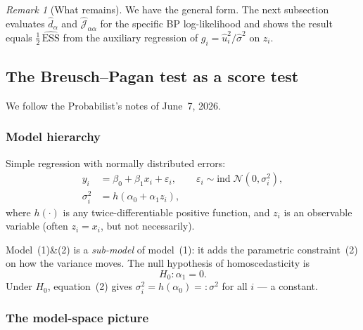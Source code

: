 \documentclass[a4paper,oneside,12pt]{extarticle}
\theoremstyle{plain}
\theoremstyle{definition}
\theoremstyle{remark}
\newtheorem{remark}[proposition]{Remark}
\begin{document}
\begin{remark}[What remains]
We have the general form.  The next subsection evaluates
$\hat{d}_\alpha$ and $\hat{\mathcal{J}}_{\alpha\alpha}$ for the
specific BP log-likelihood and shows the result equals
$\frac{1}{2}\,\widehat{\mathrm{ESS}}$ from the auxiliary
regression of $g_i = \hat{u}_i^2/\hat\sigma^2$ on $z_i$.
\end{remark}


\FloatBarrier
\subsection{The Breusch--Pagan test as a score test}
\label{subsec:bp-score}

We follow the Probabilist's notes of June~7, 2026.

\subsubsection*{Model hierarchy}

Simple regression with normally distributed errors:
\begin{align}
  y_i &= \beta_0 + \beta_1 x_i + \varepsilon_i, \qquad
  \varepsilon_i \sim \mathrm{ind}\; \mathcal{N}(0, \sigma_i^2),
  \tag{1} \\[4pt]
  \sigma_i^2 &= h(\alpha_0 + \alpha_1 z_i),
  \tag{2}
\end{align}
where $h(\cdot)$ is any twice-differentiable positive function, and
$z_i$ is an observable variable (often $z_i = x_i$, but not
necessarily).

Model~(1)\&(2) is a \emph{sub-model} of model~(1): it adds the
parametric constraint~(2) on how the variance moves. The null
hypothesis of homoscedasticity is
\[
  H_0: \alpha_1 = 0.
\]
Under $H_0$, equation~(2) gives $\sigma_i^2 = h(\alpha_0) =: \sigma^2$
for all $i$ — a constant.

\subsubsection*{The model-space picture}
\end{document}
